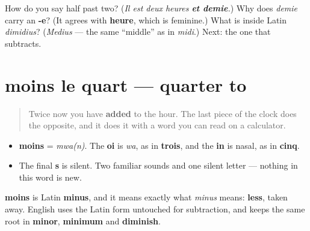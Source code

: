 \begin{tcolorbox}[breakable,colback=teal!4,colframe=teal!35!black,title={Before you move on}]
How do you say half past two? (\emph{Il est deux heures \textbf{et demie}.}) Why does \emph{demie} carry an \textbf{-e}? (It agrees with \textbf{heure}, which is feminine.) What is inside Latin \emph{dimidius}? (\emph{Medius} — the same \textquotedblleft{}middle\textquotedblright{} as in \emph{midi}.) Next: the one that subtracts.
\end{tcolorbox}
\section[moins le quart]{moins le quart — quarter to}

\label{lesson:FR-C08-moins}



\begin{quote}
Twice now you have \textbf{added} to the hour. The last piece of the clock does the opposite, and it does it with a word you can read on a calculator.
\end{quote}

\begin{sounds}
\begin{itemize}
\raggedright
  \item \textbf{moins} = \emph{mwa(n)}. The \textbf{oi} is \emph{wa}, as in \textbf{trois}, and the \textbf{in} is nasal, as in \textbf{cinq}.
  \item The final \textbf{s} is silent. Two familiar sounds and one silent letter — nothing in this word is new.
\end{itemize}
\end{sounds}

\begin{cousinweb}
\textbf{moins} is Latin \textbf{minus}, and it means exactly what \emph{minus} means: \textbf{less}, taken away. English uses the Latin form untouched for subtraction, and keeps the same root in \textbf{minor}, \textbf{minimum} and \textbf{diminish}.
\end{cousinweb}

